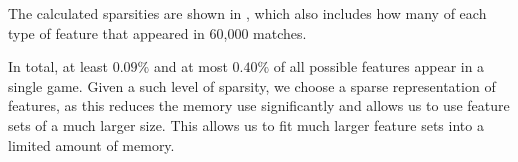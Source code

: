   \begin{table}[!htb]
    \centering
    \caption{The sparsity of each type of feature. (*)At most.}\label{tab:featuresparsity}
  \end{table}

The calculated sparsities are shown in , which also includes how many of each type of feature that appeared in 60,000 matches.

In total, at least $0.09 \%$ and at most $0.40\%$ of all possible features appear in a single game. Given a such level of sparsity, we choose a sparse representation of features, as this reduces the memory use significantly and allows us to use feature sets of a much larger size. This allows us to fit much larger feature sets into a limited amount of memory.